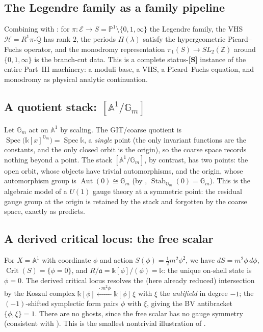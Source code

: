 \documentclass[12pt]{article}
\theoremstyle{definition}
\theoremstyle{remark}
\newcommand{\Spec}{\operatorname{Spec}}
\newcommand{\Ideal}{\mathfrak{a}}
\newcommand{\Crit}{\operatorname{Crit}}
\newcommand{\Stab}{\operatorname{Stab}}
\newcommand{\Aut}{\operatorname{Aut}}
\newcommand{\ZZ}{\mathbb{Z}}
\newcommand{\QQ}{\mathbb{Q}}
\newcommand{\PP}{\mathbb{P}}
\newcommand{\AAf}{\mathbb{A}}
\newcommand{\coeff}{\mathbb{k}}
\newcommand{\status}[1]{\textnormal{\textsf{\textbf{[#1]}}}}
\begin{document}
\subsection{The Legendre family as a family pipeline}

Combining  with : for $\pi\colon\mathcal E\to
S=\PP^1\setminus\{0,1,\infty\}$ the Legendre family, the VHS $\mathcal H = R^1\pi_\ast\underline{\QQ}$
has rank $2$, the periods $\Pi(\lambda)$ satisfy the hypergeometric Picard--Fuchs operator, and the
monodromy representation $\pi_1(S)\to SL_2(\ZZ)$ around $\{0,1,\infty\}$ is the branch-cut data. This is a
complete status-\status{S} instance of the entire Part~III machinery: a moduli base, a VHS, a
Picard--Fuchs equation, and monodromy as physical analytic continuation.

\subsection{\texorpdfstring{A quotient stack: $[\AAf^1/\mathbb G_m]$}{A quotient stack of the affine line by the multiplicative group}}

Let $\mathbb G_m$ act on $\AAf^1$ by scaling. The GIT/coarse quotient is
$\Spec\bigl(\coeff[x]^{\mathbb G_m}\bigr)=\Spec\coeff$, a \emph{single} point (the only invariant
functions are the constants, and the only closed orbit is the origin), so the coarse space records
nothing beyond a point. The stack $[\AAf^1/\mathbb G_m]$, by contrast, has two points: the open orbit,
whose objects have trivial automorphisms, and the origin, whose automorphism group is
$\Aut(0)\cong\mathbb G_m$ (by , $\Stab_{\mathbb G_m}(0)=\mathbb G_m$). This is the
algebraic model of a $U(1)$ gauge theory at a symmetric point: the residual gauge group at the origin is
retained by the stack and forgotten by the coarse space, exactly as  predicts.

\subsection{A derived critical locus: the free scalar}

For $X=\AAf^1$ with coordinate $\phi$ and action $S(\phi)=\tfrac{1}{2}m^2\phi^2$, we have $dS=m^2\phi\,
d\phi$, $\Crit(S)=\{ \phi=0\}$, and $R/\Ideal = \coeff[\phi]/(\phi)=\coeff$: the unique on-shell state is
$\phi=0$. The derived critical locus resolves the (here already reduced) intersection by the Koszul
complex $\coeff[\phi]\xleftarrow{\ \cdot m^2\phi\ }\coeff[\phi]\,\xi$ with $\xi$ the \emph{antifield} in
degree $-1$; the $(-1)$-shifted symplectic form pairs $\phi$ with $\xi$, giving the BV antibracket
$\{\phi,\xi\}=1$. There are no ghosts, since the free scalar has no gauge symmetry (consistent with
). This is the smallest nontrivial illustration of .
\end{document}
